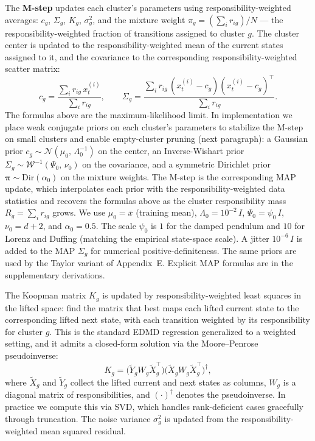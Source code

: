 \documentclass{article}
\begin{document}
The \textbf{M-step} updates each cluster's parameters using responsibility-weighted averages: $c_g$, $\Sigma_g$, $K_g$, $\sigma_g^2$, and the mixture weight $\pi_g = (\sum_i r_{ig})/N$ --- the responsibility-weighted fraction of transitions assigned to cluster $g$. The cluster center is updated to the responsibility-weighted mean of the current states assigned to it, and the covariance to the corresponding responsibility-weighted scatter matrix:
\[
c_g = \frac{\sum_i r_{ig}\, x_t^{(i)}}{\sum_i r_{ig}}, \qquad
\Sigma_g = \frac{\sum_i r_{ig}\, (x_t^{(i)} - c_g)(x_t^{(i)} - c_g)^\top}{\sum_i r_{ig}}.
\]
The formulas above are the maximum-likelihood limit. In implementation we place weak conjugate priors on each cluster's parameters to stabilize the M-step on small clusters and enable empty-cluster pruning (next paragraph): a Gaussian prior $c_g \sim \mathcal{N}(\mu_0,\, \Lambda_0^{-1})$ on the center, an Inverse-Wishart prior $\Sigma_g \sim \mathcal{W}^{-1}(\Psi_0,\, \nu_0)$ on the covariance, and a symmetric Dirichlet prior $\boldsymbol{\pi} \sim \mathrm{Dir}(\alpha_0)$ on the mixture weights. The M-step is the corresponding MAP update, which interpolates each prior with the responsibility-weighted data statistics and recovers the formulas above as the cluster responsibility mass $R_g = \sum_i r_{ig}$ grows. We use $\mu_0 = \bar{x}$ (training mean), $\Lambda_0 = 10^{-2}\, I$, $\Psi_0 = \psi_0\, I$, $\nu_0 = d + 2$, and $\alpha_0 = 0.5$. The scale $\psi_0$ is $1$ for the damped pendulum and $10$ for Lorenz and Duffing (matching the empirical state-space scale). A jitter $10^{-6}\, I$ is added to the MAP $\Sigma_g$ for numerical positive-definiteness. The same priors are used by the Taylor variant of Appendix~E. Explicit MAP formulas are in the supplementary derivations.

The Koopman matrix $K_g$ is updated by responsibility-weighted least squares in the lifted space: find the matrix that best maps each lifted current state to the corresponding lifted next state, with each transition weighted by its responsibility for cluster $g$. This is the standard EDMD regression generalized to a weighted setting, and it admits a closed-form solution via the Moore--Penrose pseudoinverse:
\[
K_g = \bigl(\tilde{Y}_g W_g \tilde{X}_g^\top\bigr)\bigl(\tilde{X}_g W_g \tilde{X}_g^\top\bigr)^{\dagger},
\]
where $\tilde{X}_g$ and $\tilde{Y}_g$ collect the lifted current and next states as columns, $W_g$ is a diagonal matrix of responsibilities, and $(\cdot)^{\dagger}$ denotes the pseudoinverse. In practice we compute this via SVD, which handles rank-deficient cases gracefully through truncation. The noise variance $\sigma_g^2$ is updated from the responsibility-weighted mean squared residual.
\end{document}
